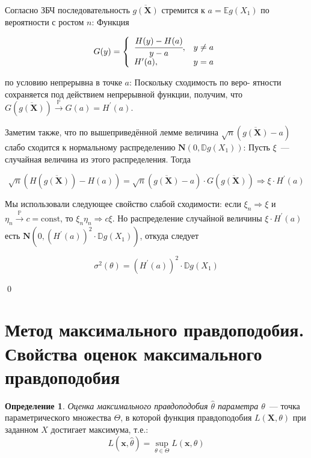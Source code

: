 \documentclass[oneside,final,14pt]{extreport}
\renewenvironment{proof}{{\bfseries Доказательство.}}{\qed}
\theoremstyle{plain}
\theoremstyle{definition}
\newtheorem*{defn}{Определение}
\theoremstyle{named}
\begin{document}
\begin{proof}
Согласно ЗБЧ последовательность $\overline{g(\mathbf{X})}$ стремится к $a=\mathbb{E} g\left(X_{1}\right)$ по вероятности с ростом $n$: Функция

\begin{equation*}
    G(y)=\left\{\begin{array}{ll}
    \cfrac{H(y)-H(a)}{y-a}, & y \neq a \\
    H^{\prime}(a), & y=a
    \end{array}\right.  
\end{equation*}

по условию непрерывна в точке $a$: Поскольку сходимость по веро-
ятности сохраняется под действием непрерывной функции, получим,
что $G(\overline{g(\mathbf{X})}) \xrightarrow[]{\mathbb{P}} G(a)=H^{\prime}(a)$.

Заметим также, что по вышеприведённой лемме величина $\sqrt{n}(\overline{g(\mathbf{X})}-a)$ слабо сходится
к нормальному распределению $\mathbf{N}(0, \mathbb{D} g(X_{1}))$: Пусть $\xi$~--- случайная величина
из этого распределения. Тогда

\begin{equation*}
    \sqrt{n}(H(\overline{g(\mathbf{X})})-H(a))=\sqrt{n}(\overline{g(\mathbf{X})}-a) \cdot G(\overline{g(\mathbf{X})}) \Rightarrow \xi \cdot H^{\prime}(a)
\end{equation*}

Мы использовали следующее свойство слабой сходимости: если $\xi_{n} \Rightarrow \xi$ и $\eta_{n} \xrightarrow[]{\mathbb{P}} c=\mathrm{const}$, то $\xi_{n} \eta_{n} \Rightarrow c \xi$. Но распределение случайной величины $\xi \cdot H^{\prime}(a)$ есть $\mathbf{N}(0,(H^{\prime}(a))^{2} \cdot \mathbb{D} g(X_{1}))$, откуда следует

\begin{equation*}
    \sigma^{2}(\theta)=\left(H^{\prime}(a)\right)^{2} \cdot \mathbb{D} g\left(X_{1}\right)
\end{equation*}

\end{proof}

\section{Метод максимального правдоподобия. Свойства оценок максимального правдоподобия}

\begin{defn}
{\it Оценка максимального правдоподобия $\hat{\theta}$ параметра $\theta$}~--- точка параметрического множества $\Theta$, в которой функция правдоподобия $L(\mathbf{X},\theta)$ при заданном $X$ достигает максимума, т.е.:
\begin{equation*}
    L(\boldsymbol{x}, \hat{\theta})=\sup\limits_{\theta \in \Theta} L(\boldsymbol{x}, \theta)
\end{equation*}
\end{defn}
\end{document}
